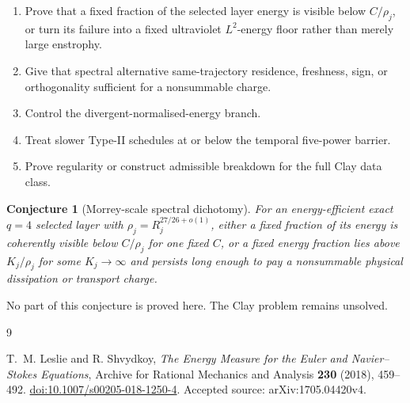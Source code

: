 \documentclass[11pt]{article}
\newtheorem{conjecture}[theorem]{Conjecture}
\theoremstyle{remark}
\begin{document}
\begin{enumerate}
\item Prove that a fixed fraction of the selected layer energy is visible
below \(C/\rho_j\), or turn its failure into a fixed ultraviolet
\(L^2\)-energy floor rather than merely large enstrophy.
\item Give that spectral alternative same-trajectory residence,
freshness, sign, or orthogonality sufficient for a nonsummable charge.
\item Control the divergent-normalised-energy branch.
\item Treat slower Type-II schedules at or below the temporal five-power
barrier.
\item Prove regularity or construct admissible breakdown for the full
Clay data class.
\end{enumerate}

\begin{conjecture}[Morrey-scale spectral dichotomy]
For an energy-efficient exact \(q=4\) selected layer with
\(\rho_j=R_j^{27/26+o(1)}\), either a fixed fraction of its energy is
coherently visible below \(C/\rho_j\) for one fixed \(C\), or a fixed
energy fraction lies above \(K_j/\rho_j\) for some \(K_j\to\infty\) and
persists long enough to pay a nonsummable physical dissipation or
transport charge.
\end{conjecture}

No part of this conjecture is proved here.  The Clay problem remains
unsolved.

\begin{thebibliography}{9}

T.~M. Leslie and R. Shvydkoy,
\emph{The Energy Measure for the Euler and Navier--Stokes Equations},
Archive for Rational Mechanics and Analysis \textbf{230} (2018),
459--492.
\href{https://doi.org/10.1007/s00205-018-1250-4}
{doi:10.1007/s00205-018-1250-4}.
Accepted source: arXiv:1705.04420v4.

\end{thebibliography}
\end{document}
